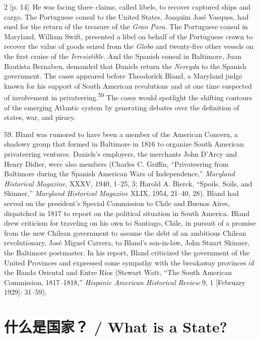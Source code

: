 \documentclass[10pt,a4paper]{article}
\begin{document}
\begin{paracol}{2}
{\scriptsize\color{gray} [p. 14]}\ He was facing three claims, called libels, to recover captured ships and cargo. The Portuguese consul to the United States, Joaquim José Vasques, had sued for the return of the treasure of the \textit{Gran Para.} The Portuguese consul in Maryland, William Swift, presented a libel on behalf of the Portuguese crown to recover the value of goods seized from the \textit{Globo} and twenty-five other vessels on the first cruise of the \textit{Irresistible.} And the Spanish consul in Baltimore, Juan Bautista Bernabeu, demanded that Daniels return the \textit{Nereyda} to the Spanish government. The cases appeared before Theodorick Bland, a Maryland judge known for his support of South American revolutions and at one time suspected of involvement in privateering.\nobreak\textsuperscript{59} The cases would spotlight the shifting contours of the emerging Atlantic system by generating debates over the definition of states, war, and piracy.\par{\small 59. Bland was rumored to have been a member of the American Concern, a shadowy group that formed in Baltimore in 1816 to organize South American privateering ventures. Daniels’s employers, the merchants John D’Arcy and Henry Didier, were also members (Charles C. Griffin, “Privateering from Baltimore during the Spanish American Wars of Independence,” \textit{Maryland Historical Magazine}, XXXV, 1940, 1–25, 3; Harold A. Bierck, “Spoils, Soils, and Skinner,” \textit{Maryland Historical Magazine} XLIX, 1954, 21–40, 28). Bland had served on the president’s Special Commission to Chile and Buenos Aires, dispatched in 1817 to report on the political situation in South America. Bland drew criticism for traveling on his own to Santiago, Chile, in pursuit of a promise from the new Chilean government to assume the debt of an ambitious Chilean revolutionary, José Miguel Carrera, to Bland’s son-in-law, John Stuart Skinner, the Baltimore postmaster. In his report, Bland criticized the government of the United Provinces and expressed some sympathy with the breakaway provinces of the Banda Oriental and Entre Ríos (Stewart Watt, “The South American Commission, 1817–1818,” \textit{Hispanic American Historical Review} 9, 1 [February 1929]: 31–59).\par}
\switchcolumn*
\end{paracol}
\section*{什么是国家？ / What is a State?}
\end{document}
